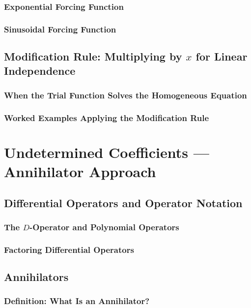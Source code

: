 \documentclass[10pt]{article}
\begin{document}
    \subsubsection{Exponential Forcing Function}
    \subsubsection{Sinusoidal Forcing Function}

\subsection{Modification Rule: Multiplying by \(x\) for Linear Independence}
    \subsubsection{When the Trial Function Solves the Homogeneous Equation}
    \subsubsection{Worked Examples Applying the Modification Rule}

\section{Undetermined Coefficients --- Annihilator Approach}

\subsection{Differential Operators and Operator Notation}
    \subsubsection{The \(D\)-Operator and Polynomial Operators}
    \subsubsection{Factoring Differential Operators}

\subsection{Annihilators}
    \subsubsection{Definition: What Is an Annihilator?}
\end{document}
